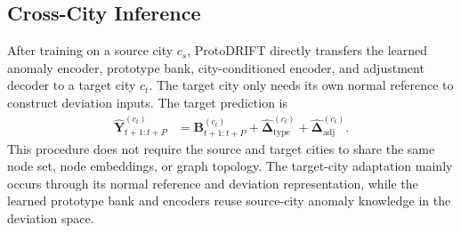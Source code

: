 \subsection{Cross-City Inference}

After training on a source city $c_s$, ProtoDRIFT directly transfers the learned anomaly encoder, prototype bank, city-conditioned encoder, and adjustment decoder to a target city $c_t$. The target city only needs its own normal reference to construct deviation inputs. The target prediction is
\begin{equation}
\begin{aligned}
    \widehat{\mathbf{Y}}^{(c_t)}_{t+1:t+P}
    &=\mathbf{B}^{(c_t)}_{t+1:t+P}
    +\widehat{\boldsymbol{\Delta}}^{(c_t)}_{\mathrm{type}}
    +\widehat{\boldsymbol{\Delta}}^{(c_t)}_{\mathrm{adj}}.
\end{aligned}
\end{equation}
This procedure does not require the source and target cities to share the same node set, node embeddings, or graph topology. The target-city adaptation mainly occurs through its normal reference and deviation representation, while the learned prototype bank and encoders reuse source-city anomaly knowledge in the deviation space.